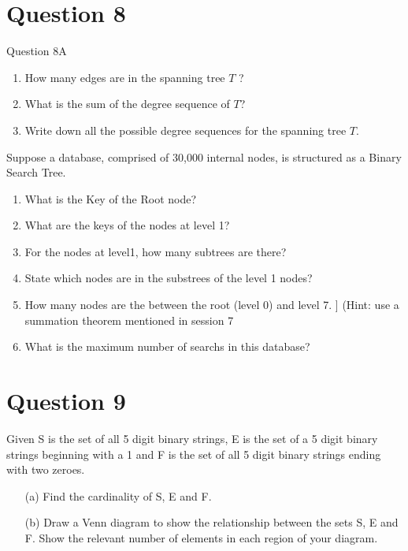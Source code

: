 \documentclass[12pt]{article} %
\begin{document}
\section*{Question 8}
	Question 8A
	\begin{enumerate}
		\item How many edges are in the spanning tree $T$ ?
		\item What is the sum of the degree sequence of $T$?
		\item Write down all the possible degree sequences for the spanning tree $T$.
	\end{enumerate}
	

Suppose a database, comprised of 30,000 internal nodes, is structured as a Binary Search Tree.

\begin{enumerate}
	\item What is the Key of the Root node?
	\item What are the keys of the nodes at level 1?
	\item For the nodes at level1, how many subtrees are there?
	\item State which nodes are in the substrees of the level 1 nodes?
	\item How many nodes are the between the root (level 0) and level 7. ]
	(Hint: use a summation theorem mentioned in session 7
	\item What is the maximum number of searchs in this database?
\end{enumerate}


\section*{ Question 9 }
Given S is the set of all 5 digit binary strings, E is the set of a 5 digit
binary strings beginning with a 1 and F is the set of all 5 digit binary strings ending
with two zeroes.
\begin{itemize}
	\item[(a)] Find the cardinality of S, E and F.
	\item[(b)] Draw a Venn diagram to show the relationship between the sets S, E and F.
	Show the relevant number of elements in each region of your diagram.
\end{itemize}
\end{document}
